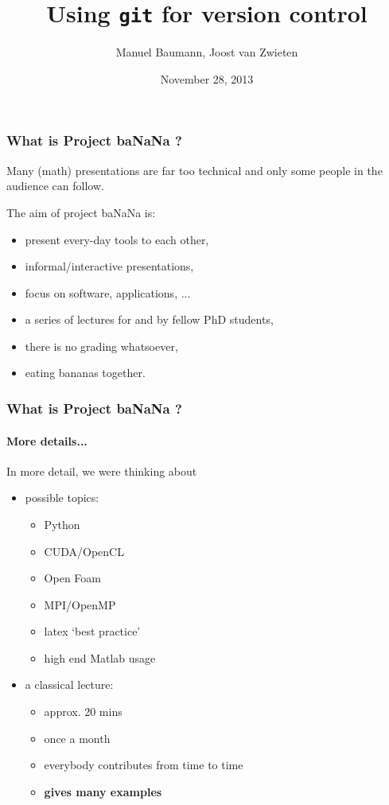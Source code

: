 \documentclass{beamer}
\title{\huge{Using \texttt{git} for version control}}
\author{Manuel Baumann, Joost van Zwieten}
\date{\footnotesize{November 28, 2013}}
\begin{document}
\frame{\titlepage}
\begin{frame}
\frametitle{What is Project baNaNa ?}
Many (math) presentations are far too technical and only some people in the audience can follow.

The aim of project ba\color{red}NaN\color{black}a is:
\begin{itemize}
 \item present every-day tools to each other,
 \pause
 \item informal/interactive presentations,
 \pause
 \item focus on software, applications, ...
 \pause
 \item a series of lectures for and by fellow PhD students,
 \pause
 \item there is no grading whatsoever, 
 \pause
 \item eating bananas together.
\end{itemize}
\end{frame}

\begin{frame}
\frametitle{What is Project baNaNa ?}
\framesubtitle{More details...}
In more detail, we were thinking about
\begin{itemize}
 \item possible topics:
 \begin{itemize}
 \item Python
 \item CUDA/OpenCL
 \item Open Foam
 \item MPI/OpenMP
 \item latex `best practice'
 \item high end Matlab usage
 \end{itemize}
 \item a classical lecture:
  \begin{itemize}
 \item approx. 20 mins
 \item once a month
 \item everybody contributes from time to time
 \item \textbf{gives many examples}
 \end{itemize}
\end{itemize}
\end{frame}
\end{document}
